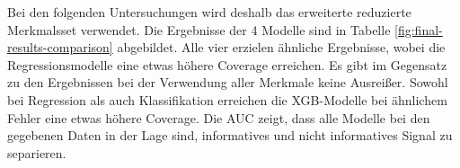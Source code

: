 Bei den folgenden Untersuchungen wird deshalb das erweiterte reduzierte Merkmalsset verwendet. Die Ergebnisse der 4 Modelle sind in Tabelle \ref{fig:final-results-comparison} abgebildet. Alle vier erzielen ähnliche Ergebnisse, wobei die Regressionsmodelle eine etwas höhere Coverage erreichen. Es gibt im Gegensatz zu den Ergebnissen bei der Verwendung aller Merkmale keine Ausreißer. Sowohl bei Regression als auch Klassifikation erreichen die \ac{XGB}-Modelle bei ähnlichem Fehler eine etwas höhere Coverage. Die \ac{AUC} zeigt, dass alle Modelle bei den gegebenen Daten in der Lage sind, informatives und nicht informatives Signal zu separieren.

